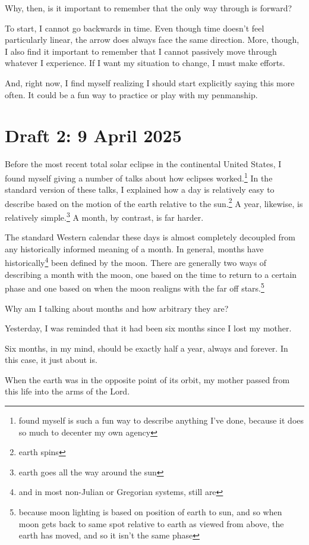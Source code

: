 \documentclass[12pt]{article}
\renewcommand{\,}{\textsuperscript{,}}
\begin{document}
Why, then, is it important to remember that the only way through is forward?

To start, I cannot go backwards in time.  
Even though time doesn't feel particularly linear, the arrow does always face the same direction.  
More, though, I also find it important to remember that I cannot passively move through whatever I experience.  
If I want my situation to change, I must make efforts.

And, right now, I find myself realizing I should start explicitly saying this more often.  
It could be a fun way to practice or play with my penmanship.

\section{Draft 2: 9 April 2025}

Before the most recent total solar eclipse in the continental United States, I found myself giving a number of talks about how eclipses worked.\footnote{found myself is such a fun way to describe anything I've done, because it does so much to decenter my own agency}  
In the standard version of these talks, I explained how a day is relatively easy to describe based on the motion of the earth relative to the sun.\footnote{earth spins}  
A year, likewise, is relatively simple.\footnote{earth goes all the way around the sun}  
A month, by contrast, is far harder.

The standard Western calendar these days is almost completely decoupled from any historically informed meaning of a month.  
In general, months have historically\footnote{and in most non-Julian or Gregorian systems, still are} been defined by the moon.  
There are generally two ways of describing a month with the moon, one based on the time to return to a certain phase and one based on when the moon realigns with the far off stars.\footnote{because moon lighting is based on position of earth to sun, and so when moon gets back to same spot relative to earth as viewed from above, the earth has moved, and so it isn't the same phase}

Why am I talking about months and how arbitrary they are?

Yesterday, I was reminded that it had been six months since I lost my mother.

Six months, in my mind, should be exactly half a year, always and forever.  
In this case, it just about is.

When the earth was in the opposite point of its orbit, my mother passed from this life into the arms of the Lord.
\end{document}
